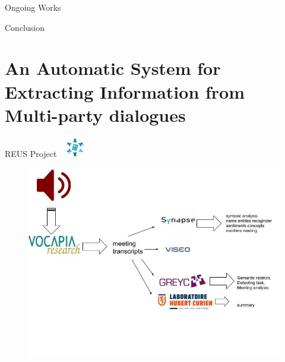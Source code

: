 \documentclass{beamer}
\begin{document}

\begin{frame}{Ongoing Works}

\end{frame}


\begin{frame}{Conclusion}

\end{frame}


\section{An Automatic System for Extracting Information from Multi-party dialogues}
\begin{frame}{REUS Project \hspace*{7.1cm}~ \includegraphics[width=0.8cm]{images/reus.png}}

\begin{figure}
\includegraphics[width=12cm]{images/reus-.jpg}
\end{figure}

\end{frame}
\end{document}
